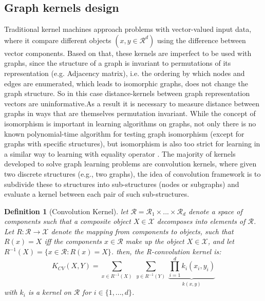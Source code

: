 \subsection{Graph kernels design}
Traditional kernel machines approach problems with vector-valued input data, where it compare different objects $(x,y \in \mathcal{R}^d)$ using the difference between vector components. Based on that, these kernels are imperfect to be used with graphs, since the structure of a graph is invariant to permutations of its representation (e.g. Adjacency matrix), i.e. the ordering by which nodes and edges are enumerated, which leads to isomorphic graphs, does not change the graph structure. So in this case distance-kernels between graph representation vectors are uninformative.As a result it is necessary to measure distance between graphs in ways that are themselves permutation invariant. While the concept of isomorphism is important in learning algorithms on graphs,  not only there is no known polynomial-time algorithm for testing graph isomorphism (except for graphs with specific structures), but isomorphism is also too strict for learning in a similar way to learning with equality operator \citep{kriege_graph_kernels}. \newline
The majority of kernels developed to solve graph learning problems are convolution kernels, where given two discrete structures (e.g., two graphs), the idea of convolution framework is to subdivide these to structures into sub-structures (nodes or subgraphs) and evaluate a kernel between each pair of such sub-structures. 
\newtheorem{definition}{Definition} 
\begin{definition}[Convolution Kernel]
let $\mathcal{R}=\mathcal{R}_1\times...\times \mathcal{R}_d$ denote a space of components such that a composite object $X\in \mathcal{X}$ decomposes into elements of $\mathcal{R}$. Let $R:\mathcal{R}\xrightarrow{}\mathcal{X}$ denote the mapping from components to objects, such that $R(x)=X$ iff the components $x\in \mathcal{R}$ make up the object $X\in \mathcal{X}$, and let $R^{-1}(X)=\{x\in\mathcal{R}:R(x)=X\}$. then, the R-convolution kernel is:
\begin{equation}
\label{eq:conolutional_kernels}
    K_{CV}(X,Y)=\sum_{x\in R^{-1}(X)}~\sum_{y\in R^{-1}(Y)}~\underbrace{\prod_{i=1}^{d}k_i(x_i,y_i)}_{k(x,y)}
\end{equation}
with $k_i$ is a kernel on $\mathcal{R}$ for $i\in\{1,...,d\}$.
\end{definition}

